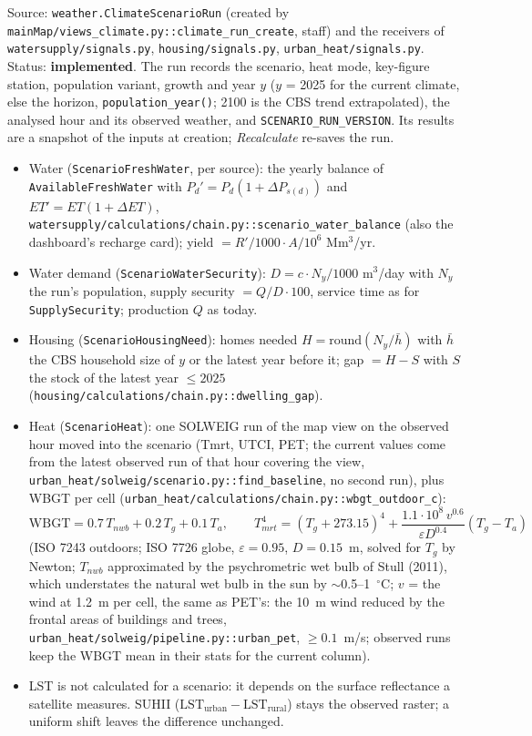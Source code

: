 \documentclass[11pt]{article}
\newcommand{\code}[1]{\texttt{#1}}
\begin{document}
Source: \code{weather.ClimateScenarioRun} (created by \code{mainMap/views\_climate.py::climate\_run\_create}, staff) and the receivers of \code{watersupply/signals.py}, \code{housing/signals.py}, \code{urban\_heat/signals.py}. Status: \textbf{implemented}. The run records the scenario, heat mode, key-figure station, population variant, growth and year $y$ ($y$ = 2025 for the current climate, else the horizon, \code{population\_year()}; 2100 is the CBS trend extrapolated), the analysed hour and its observed weather, and \code{SCENARIO\_RUN\_VERSION}. Its results are a snapshot of the inputs at creation; \emph{Recalculate} re-saves the run.

\begin{itemize}
  \item Water (\code{ScenarioFreshWater}, per source): the yearly balance of \code{AvailableFreshWater} with $P_d' = P_d (1 + \Delta P_{s(d)})$ and $ET' = ET (1 + \Delta ET)$, \code{watersupply/calculations/chain.py::scenario\_water\_balance} (also the dashboard's recharge card); yield $= R'/1000 \cdot A / 10^6$ Mm$^3$/yr.
  \item Water demand (\code{ScenarioWaterSecurity}): $D = c \cdot N_y / 1000$ m$^3$/day with $N_y$ the run's population, supply security $= Q/D \cdot 100$, service time as for \code{SupplySecurity}; production $Q$ as today.
  \item Housing (\code{ScenarioHousingNeed}): homes needed $H = \mathrm{round}(N_y / \bar{h})$ with $\bar{h}$ the CBS household size of $y$ or the latest year before it; gap $= H - S$ with $S$ the stock of the latest year $\leq 2025$ (\code{housing/calculations/chain.py::dwelling\_gap}).
  \item Heat (\code{ScenarioHeat}): one SOLWEIG run of the map view on the observed hour moved into the scenario (Tmrt, UTCI, PET; the current values come from the latest observed run of that hour covering the view, \code{urban\_heat/solweig/scenario.py::find\_baseline}, no second run), plus WBGT per cell (\code{urban\_heat/calculations/chain.py::wbgt\_outdoor\_c}):
  \begin{equation}
    \mathrm{WBGT} = 0.7\,T_{nwb} + 0.2\,T_g + 0.1\,T_a,\qquad
    T_{mrt}^4 = (T_g + 273.15)^4 + \frac{1.1\cdot10^8\,v^{0.6}}{\varepsilon D^{0.4}}(T_g - T_a)
  \end{equation}
  (ISO 7243 outdoors; ISO 7726 globe, $\varepsilon = 0.95$, $D = 0.15$~m, solved for $T_g$ by Newton; $T_{nwb}$ approximated by the psychrometric wet bulb of Stull (2011), which understates the natural wet bulb in the sun by $\sim$0.5--1~$^\circ$C; $v$ = the wind at 1.2~m per cell, the same as PET's: the 10~m wind reduced by the frontal areas of buildings and trees, \code{urban\_heat/solweig/pipeline.py::urban\_pet}, $\geq 0.1$~m/s; observed runs keep the WBGT mean in their stats for the current column).
  \item LST is not calculated for a scenario: it depends on the surface reflectance a satellite measures. SUHII ($\mathrm{LST}_{\mathrm{urban}} - \mathrm{LST}_{\mathrm{rural}}$) stays the observed raster; a uniform shift leaves the difference unchanged.
\end{itemize}
\end{document}
